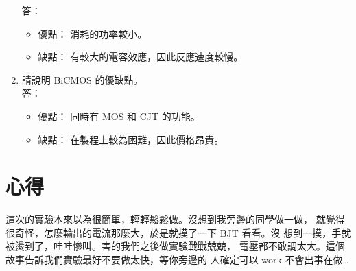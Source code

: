\documentclass[12pt, a4paper]{article}
\begin{document}
\begin{enumerate}[itemsep=20pt, topsep=10pt]
    答：
    \begin{itemize}
      \item 優點： 消耗的功率較小。
      \item 缺點： 有較大的電容效應，因此反應速度較慢。
    \end{itemize}
  \item {請說明 BiCMOS 的優缺點。} \\[10pt]
    答：
    \begin{itemize}
      \item 優點： 同時有 MOS 和 CJT 的功能。
      \item 缺點： 在製程上較為困難，因此價格昂貴。
    \end{itemize}

\end{enumerate}

\section{心得}
這次的實驗本來以為很簡單，輕輕鬆鬆做。沒想到我旁邊的同學做一做，
就覺得很奇怪，怎麼輸出的電流那麼大，於是就摸了一下 BJT 看看。沒
想到一摸，手就被燙到了，哇哇慘叫。害的我們之後做實驗戰戰兢兢，
電壓都不敢調太大。這個故事告訴我們實驗最好不要做太快，等你旁邊的
人確定可以 work 不會出事在做…
\end{document}
